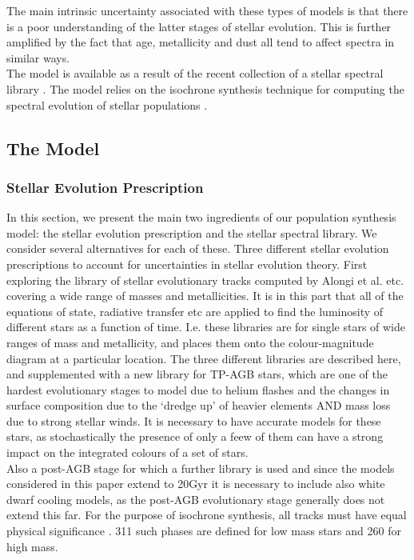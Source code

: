 \documentclass{literature}
\begin{document}
The main intrinsic uncertainty associated with these types of models is that there is a poor understanding of the latter stages of stellar evolution. This is further amplified by the fact that age, metallicity and dust all tend to affect spectra in similar ways. \\ 

The model is available as a result of the recent collection of a stellar spectral library \citep{Borgne2003}. The model relies on the isochrone synthesis technique for computing the spectral evolution of stellar populations \citep{Charlot1991}. 

\subsection{The Model}
\subsubsection{Stellar Evolution Prescription}
In this section, we present the main two ingredients of our population synthesis model: the stellar evolution prescription and the stellar spectral library. We consider several alternatives for each of these. Three different stellar evolution prescriptions to account for uncertainties in stellar evolution theory. First exploring the library of stellar evolutionary tracks computed by Alongi et al. etc. covering a wide range of masses and metallicities. It is in this part that all of the equations of state, radiative transfer etc are applied to find the luminosity of different stars as a function of time. I.e. these libraries are for single stars of wide ranges of mass and metallicity, and places them onto the colour-magnitude diagram at a particular location. The three different libraries are described here, and supplemented with a new library for TP-AGB stars, which are one of the hardest evolutionary stages to model due to helium flashes and the changes in surface composition due to the `dredge up' of heavier elements AND mass loss due to strong stellar winds. It is necessary to have accurate models for these stars, as stochastically the presence of only a feew of them can have a strong impact on the integrated colours of a set of stars. \\ 
Also a post-AGB stage for which a further library is used and since the models considered in this paper extend to 20Gyr it is necessary to include also white dwarf cooling models, as the post-AGB evolutionary stage generally does not extend this far. For the purpose of isochrone synthesis, all tracks must have equal physical significance \citep{Charlot1991}. 311 such phases are defined for low mass stars and 260 for high mass. \\
\end{document}

